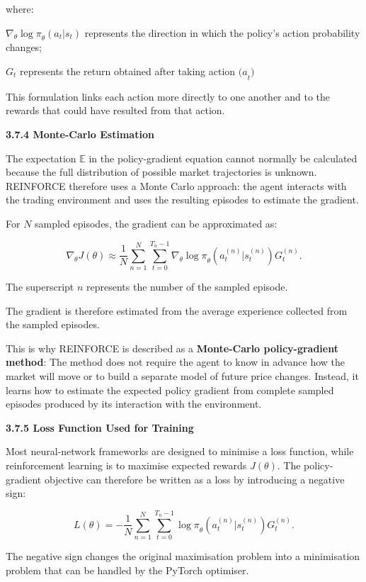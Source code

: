 where:

\(\nabla_{\theta}{\log\pi}_{\theta}\left( a_{t}|s_{t} \right)\)
represents the direction in which the policy's action probability
changes;

\(G_{t}\) represents the return obtained after taking action
\({(a}_{t})\)

This formulation links each action more directly to one another and to
the rewards that could have resulted from that action.

\textbf{3.7.4 Monte-Carlo Estimation}

The expectation \(\mathbb{E}\) in the policy-gradient equation cannot
normally be calculated because the full distribution of possible market
trajectories is unknown. REINFORCE therefore uses a Monte Carlo
approach: the agent interacts with the trading environment and uses the
resulting episodes to estimate the gradient.

For \(N\) sampled episodes, the gradient can be approximated as:

\[\nabla_{\theta}J(\theta) \approx \frac{1}{N}\sum_{n = 1}^{N}{\sum_{t = 0}^{T_{n} - 1}\nabla_{\theta}}{\log\pi}_{\theta}\left( a_{t}^{(n)}|s_{t}^{(n)} \right)G_{t}^{(n)}.\]

The superscript \(n\) represents the number of the sampled episode.

The gradient is therefore estimated from the average experience
collected from the sampled episodes.

This is why REINFORCE is described as a \textbf{Monte-Carlo
policy-gradient method}: The method does not require the agent to know
in advance how the market will move or to build a separate model of
future price changes. Instead, it learns how to estimate the expected
policy gradient from complete sampled episodes produced by its
interaction with the environment.

\textbf{3.7.5 Loss Function Used for Training}

Most neural-network frameworks are designed to minimise a loss function,
while reinforcement learning is to maximise expected rewards
\(J(\theta)\). The policy-gradient objective can therefore be written as
a loss by introducing a negative sign:

\[L(\theta) = - \frac{1}{N}\sum_{n = 1}^{N}{\sum_{t = 0}^{T_{n} - 1}{\log\pi}_{\theta}}\left( a_{t}^{(n)}|s_{t}^{(n)} \right)G_{t}^{(n)}.\]

The negative sign changes the original maximisation problem into a
minimisation problem that can be handled by the PyTorch optimiser.

